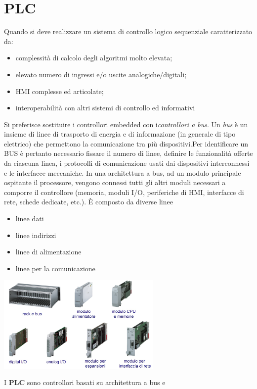 \documentclass[10pt, letterpaper]{report}
\begin{document}
\section{PLC}
Quando si deve realizzare un sistema di controllo logico sequenziale caratterizzato da:\begin{itemize} 
\item complessità di calcolo degli algoritmi molto elevata;
\item elevato numero di ingressi e/o uscite analogiche/digitali;
\item HMI complesse ed articolate;
\item interoperabilità con altri sistemi di controllo ed informativi\end{itemize}
Si preferisce sostituire i controllori embedded con i\textit{controllori a bus}.\acc 
{} Un \textit{bus} è un insieme di linee di trasporto di energia e di informazione (in generale
di tipo elettrico) che permettono la comunicazione tra più dispositivi.\acc Per identificare un BUS è pertanto necessario fissare il numero di linee, definire le
funzionalità offerte da ciascuna linea, i protocolli di comunicazione usati dai
dispositivi interconnessi e le interfacce meccaniche. In una architettura a bus, ad un modulo principale ospitante il processore, vengono
connessi tutti gli altri moduli necessari a comporre il controllore (memoria, moduli
I/O, periferiche di HMI, interfacce di rete, schede dedicate, etc.).
È composto da diverse 
linee\begin{itemize}
    \item linee dati 
    \item linee indirizzi 
    \item linee di alimentazione 
    \item linee per la comunicazione
\end{itemize}
\begin{center}
    \includegraphics[width=0.6\textwidth ]{images/bus.png}
\end{center}
I \textbf{PLC} sono controllori basati su architettura a bus e
\end{document}
